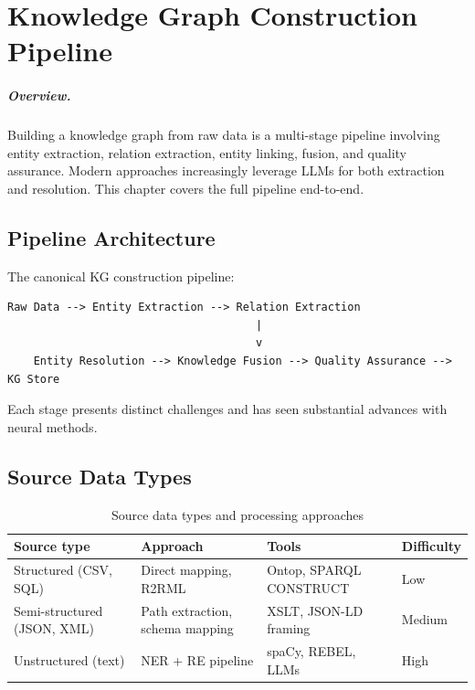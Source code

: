 \documentclass[11pt,a4paper,oneside,openany]{book}
\theoremstyle{definition}
\theoremstyle{plain}
\theoremstyle{remark}
\begin{document}
\chapter{Knowledge Graph Construction Pipeline}\label{ch:construction}

\paragraph{Overview.}
Building a knowledge graph from raw data is a multi-stage pipeline involving entity extraction, relation extraction, entity linking, fusion, and quality assurance. Modern approaches increasingly leverage LLMs for both extraction and resolution. This chapter covers the full pipeline end-to-end.

\section{Pipeline Architecture}\label{sec:pipeline}

The canonical KG construction pipeline:

\begin{verbatim}
Raw Data --> Entity Extraction --> Relation Extraction
                                      |
                                      v
    Entity Resolution --> Knowledge Fusion --> Quality Assurance --> KG Store
\end{verbatim}

Each stage presents distinct challenges and has seen substantial advances with neural methods.

\section{Source Data Types}\label{sec:sources}

\begin{table}[h]
	\centering
	\caption{Source data types and processing approaches}
	\label{tab:sources}
	\begin{tabular}{lp{4cm}p{4cm}p{3.5cm}}
		\toprule
		Source type                 & Approach                        & Tools                   & Difficulty \\
		\midrule
		Structured (CSV, SQL)       & Direct mapping, R2RML           & Ontop, SPARQL CONSTRUCT & Low        \\
		Semi-structured (JSON, XML) & Path extraction, schema mapping & XSLT, JSON-LD framing   & Medium     \\
		Unstructured (text)         & NER + RE pipeline               & spaCy, REBEL, LLMs      & High       \\
		\bottomrule
	\end{tabular}
\end{table}
\end{document}
